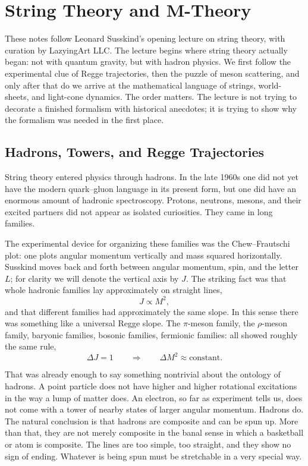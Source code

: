 \chapter{String Theory and M-Theory}

These notes follow Leonard Susskind's opening lecture on string theory, with curation by LazyingArt LLC. The lecture begins where string theory actually began: not with quantum gravity, but with hadron physics. We first follow the experimental clue of Regge trajectories, then the puzzle of meson scattering, and only after that do we arrive at the mathematical language of strings, world-sheets, and light-cone dynamics. The order matters. The lecture is not trying to decorate a finished formalism with historical anecdotes; it is trying to show why the formalism was needed in the first place.

\section{Hadrons, Towers, and Regge Trajectories}

String theory entered physics through hadrons. In the late 1960s one did not yet have the modern quark--gluon language in its present form, but one did have an enormous amount of hadronic spectroscopy. Protons, neutrons, mesons, and their excited partners did not appear as isolated curiosities. They came in long families.

The experimental device for organizing these families was the Chew--Frautschi plot: one plots angular momentum vertically and mass squared horizontally. Susskind moves back and forth between angular momentum, spin, and the letter \(L\); for clarity we will denote the vertical axis by \(J\). The striking fact was that whole hadronic families lay approximately on straight lines,
\begin{equation}
J \propto M^2,
\end{equation}
and that different families had approximately the same slope. In this sense there was something like a universal Regge slope. The \(\pi\)-meson family, the \(\rho\)-meson family, baryonic families, bosonic families, fermionic families: all showed roughly the same rule,
\begin{equation}
\Delta J = 1
\qquad \Longrightarrow \qquad
\Delta M^2 \approx \text{constant}.
\end{equation}

That was already enough to say something nontrivial about the ontology of hadrons. A point particle does not have higher and higher rotational excitations in the way a lump of matter does. An electron, so far as experiment tells us, does not come with a tower of nearby states of larger angular momentum. Hadrons do. The natural conclusion is that hadrons are composite and can be spun up. More than that, they are not merely composite in the banal sense in which a basketball or atom is composite. The lines are too simple, too straight, and they show no sign of ending. Whatever is being spun must be stretchable in a very special way.

